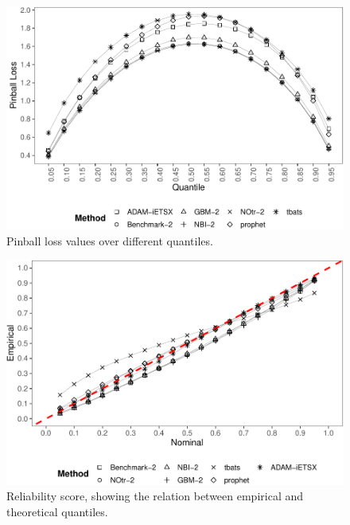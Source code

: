 \documentclass[]{elsarticle} %
\begin{document}
\begin{figure}[H]

{\centering \includegraphics[width=0.9\linewidth]{paper_files/figure-latex/Pinball-1} 

}

\caption{Pinball loss values over different quantiles.}\label{fig:Pinball}
\end{figure}

\begin{figure}[H]

{\centering \includegraphics[width=0.9\linewidth]{paper_files/figure-latex/Reliability-1} 

}

\caption{Reliability score, showing the relation between empirical and theoretical quantiles.}\label{fig:Reliability}
\end{figure}
\end{document}

